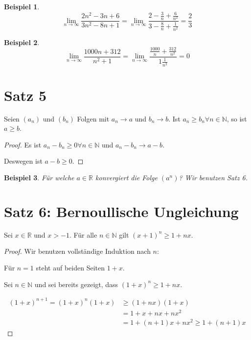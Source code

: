 \documentclass[a4paper,10pt]{article}
\newtheorem*{example}{Beispiel}
\begin{document}
\begin{example}
 \begin{equation*}
  \lim_{n \rightarrow \infty} \frac{2n^2 - 3n + 6}{3n^2 - 8n + 1} = \lim_{n \rightarrow \infty} \frac{2 - \frac{3}{n} + \frac{6}{n^2}}{3 - \frac{8}{n} + \frac{1}{n^2}} = \frac{2}{3}
 \end{equation*}
\end{example}

\begin{example}
 \begin{equation*}
  \lim_{n \rightarrow \infty} \frac{1000n + 312}{n^2 + 1} = \lim_{n \rightarrow \infty} \frac{\frac{1000}{n} + \frac{312}{n^2}}{1 \frac{1}{n^2}} = 0
 \end{equation*}
\end{example}

\section*{Satz 5}

Seien $(a_n)$ und $(b_n)$ Folgen mit $a_n \rightarrow a$ und $b_n \rightarrow b$.
Ist $a_n \ge b_n \forall n \in \mathbb{N}$, so ist $a \ge b$.

\begin{proof}
 Es ist $a_n - b_n \ge 0 \forall n \in \mathbb{N}$ und $a_n - b_n \rightarrow a - b$.
 
 Deswegen ist $a - b \ge 0$.
\end{proof}

\begin{example}
 Für welche $a \in \mathbb{R}$ konvergiert die Folge $(a^n)$?
 Wir benutzen Satz 6.
\end{example}

\section*{Satz 6: Bernoullische Ungleichung}

Sei $x \in \mathbb{R}$ und $x > -1$.
Für alle $n \in \mathbb{N}$ gilt $(x + 1)^n \ge 1 + nx$.

\begin{proof}
 Wir benutzen vollständige Induktion nach $n$:
 
 Für $n = 1$ steht auf beiden Seiten $1 + x$.
 
 Sei $n \in \mathbb{N}$ und sei bereits gezeigt, dass $(1 + x)^n \ge 1 + nx$.
 
 \begin{align*}
  (1 + x)^{n + 1} = (1 + x)^n(1 + x) & \ge (1 + nx)(1 + x)\\
  & = 1 + x + nx + nx^2\\
  & = 1 + (n + 1)x + nx^2 \ge 1 + (n + 1)x
 \end{align*}
\end{proof}
\end{document}
